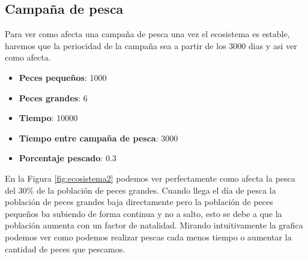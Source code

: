 \documentclass[12pt,a4paper]{article}
\begin{document}
\subsection{Campaña de pesca}
Para ver como afecta una campaña de pesca una vez el ecosistema es estable, haremos que la periocidad de la campaña sea a partir de los 3000 dias y asi ver como afecta.
\begin{itemize}
	\item \textbf{Peces pequeños}: 1000
	\item \textbf{Peces grandes}: 6
	\item \textbf{Tiempo}: 10000
	\item \textbf{Tiempo entre campaña de pesca}: 3000
	\item \textbf{Porcentaje pescado}: 0.3
\end{itemize}
En la Figura \ref{fig:ecosistema2} podemos ver perfectamente como afecta la pesca del 30\% de la población de peces grandes. Cuando llega el día de pesca la población de peces grandes baja directamente pero la población de peces pequeños ba subiendo de forma continua y no a salto, esto se debe a que la población aumenta con un factor de natalidad. Mirando intuitivamente la grafica podemos ver como podemos realizar pescas cada menos tiempo o aumentar la cantidad de peces que pescamos.
\end{document}
